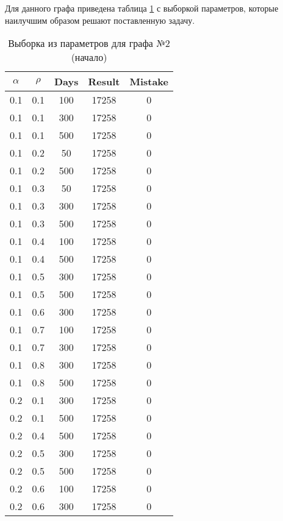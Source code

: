 Для данного графа приведена таблица \ref{tbl:table_graph2_part1} с выборкой параметров, которые наилучшим образом решают поставленную задачу.

\clearpage

\begin{table}[ht]
	\small
	\begin{center}
		\begin{threeparttable}
			\caption{Выборка из параметров для графа №2 (начало)}
			\label{tbl:table_graph2_part1}
			\begin{tabular}{|c|c|c|c|c|}
				\hline
				$\alpha$ & $\rho$ & Days & Result & Mistake \\ 
				\hline
				 0.1 &  0.1 &  100 & 17258 &     0 \\
				 0.1 &  0.1 &  300 & 17258 &     0 \\
				 0.1 &  0.1 &  500 & 17258 &     0 \\
				 0.1 &  0.2 &   50 & 17258 &     0 \\
				 0.1 &  0.2 &  500 & 17258 &     0 \\
				 0.1 &  0.3 &   50 & 17258 &     0 \\
				 0.1 &  0.3 &  300 & 17258 &     0 \\
				 0.1 &  0.3 &  500 & 17258 &     0 \\
				 0.1 &  0.4 &  100 & 17258 &     0 \\
				 0.1 &  0.4 &  500 & 17258 &     0 \\
				 0.1 &  0.5 &  300 & 17258 &     0 \\
				 0.1 &  0.5 &  500 & 17258 &     0 \\
				 0.1 &  0.6 &  300 & 17258 &     0 \\
				 0.1 &  0.7 &  100 & 17258 &     0 \\
				 0.1 &  0.7 &  300 & 17258 &     0 \\
				 0.1 &  0.8 &  300 & 17258 &     0 \\
				 0.1 &  0.8 &  500 & 17258 &     0 \\ \hline
				 0.2 &  0.1 &  300 & 17258 &     0 \\
				 0.2 &  0.1 &  500 & 17258 &     0 \\
				 0.2 &  0.4 &  500 & 17258 &     0 \\
				 0.2 &  0.5 &  300 & 17258 &     0 \\
				 0.2 &  0.5 &  500 & 17258 &     0 \\
				 0.2 &  0.6 &  100 & 17258 &     0 \\
				 0.2 &  0.6 &  300 & 17258 &     0 \\

\end{tabular}
\end{threeparttable}
\end{center}
\end{table}
